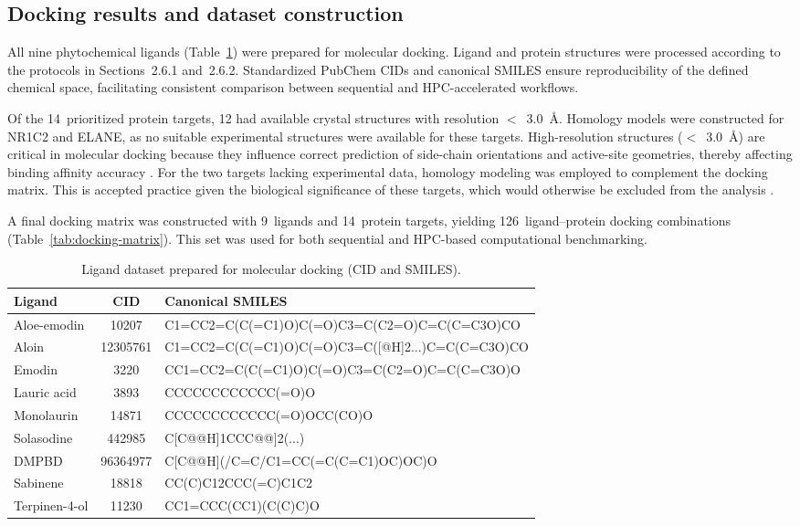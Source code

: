 \documentclass[11pt,a4paper]{article}
\begin{document}
\subsection{Docking results and dataset construction}

All nine phytochemical ligands (Table~\ref{tab:ligands}) were prepared for molecular docking. Ligand and protein structures were processed according to the protocols in Sections~2.6.1 and~2.6.2. Standardized PubChem CIDs and canonical SMILES ensure reproducibility of the defined chemical space, facilitating consistent comparison between sequential and HPC-accelerated workflows.

Of the 14~prioritized protein targets, 12 had available crystal structures with resolution $<$~3.0~\AA{}. Homology models were constructed for NR1C2 and ELANE, as no suitable experimental structures were available for these targets. High-resolution structures ($<$~3.0~\AA{}) are critical in molecular docking because they influence correct prediction of side-chain orientations and active-site geometries, thereby affecting binding affinity accuracy \cite{flachsenberg2023,barcelos2022}. For the two targets lacking experimental data, homology modeling was employed to complement the docking matrix. This is accepted practice given the biological significance of these targets, which would otherwise be excluded from the analysis \cite{barcelos2022}.

A final docking matrix was constructed with 9~ligands and 14~protein targets, yielding 126~ligand--protein docking combinations (Table~\ref{tab:docking-matrix}). This set was used for both sequential and HPC-based computational benchmarking.

\begin{table}[!ht]
\centering
\caption{Ligand dataset prepared for molecular docking (CID and SMILES).}
\label{tab:ligands}
\small
\begin{tabularx}{\textwidth}{lcp{8cm}}
\toprule
\textbf{Ligand} & \textbf{CID} & \textbf{Canonical SMILES} \\
\midrule
Aloe-emodin & 10207 & C1=CC2=C(C(=C1)O)C(=O)C3=C(C2=O)C=C(C=C3O)CO \\
Aloin        & 12305761 & C1=CC2=C(C(=C1)O)C(=O)C3=C({[}@H{]}2...)C=C(C=C3O)CO \\
Emodin       & 3220    & CC1=CC2=C(C(=C1)O)C(=O)C3=C(C2=O)C=C(C=C3O)O \\
Lauric acid  & 3893    & CCCCCCCCCCCC(=O)O \\
Monolaurin   & 14871   & CCCCCCCCCCCC(=O)OCC(CO)O \\
Solasodine   & 442985  & C{[}C@@H{]}1CCC@@{]}2(...) \\
DMPBD        & 96364977 & C{[}C@@H{]}(/C=C/C1=CC(=C(C=C1)OC)OC)O \\
Sabinene     & 18818   & CC(C)C12CCC(=C)C1C2 \\
Terpinen-4-ol & 11230  & CC1=CCC(CC1)(C(C)C)O \\
\bottomrule
\end{tabularx}
\end{table}
\end{document}
